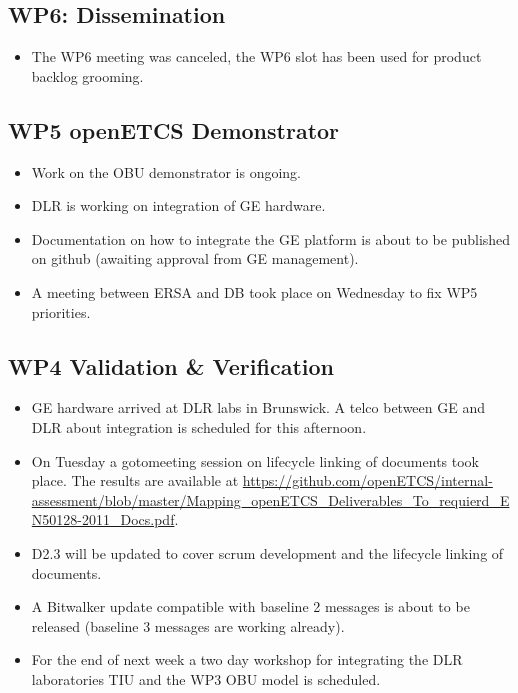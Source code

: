 \documentclass[a4paper, 11pt]{article}
\begin{document}
\subsection{WP6: Dissemination}
\begin{itemize}
\item The WP6 meeting was canceled, the WP6 slot has been used for product backlog grooming.
\end{itemize}

\subsection{WP5 openETCS Demonstrator}

\begin{itemize}
\item Work on the OBU demonstrator is ongoing.
\item DLR is working on integration of GE hardware.
\item Documentation on how to integrate the GE platform is about to be published on github (awaiting approval from GE management).
\item A meeting between ERSA and DB took place on Wednesday to fix WP5 priorities.
\end{itemize}

\subsection{WP4 Validation \& Verification}
\begin{itemize}
\item GE hardware arrived at DLR labs in Brunswick. A telco between GE and DLR about integration is scheduled for this afternoon.
\item On Tuesday a gotomeeting session on lifecycle linking of documents took place. The results are available at \url{https://github.com/openETCS/internal-assessment/blob/master/Mapping_openETCS_Deliverables_To_requierd_EN50128-2011_Docs.pdf}.
\item D2.3 will be updated to cover scrum development and the lifecycle linking of documents. 
\item A Bitwalker update compatible with baseline 2 messages is about to be released (baseline 3 messages are working already).
\item For the end of next week a two day workshop for integrating the DLR laboratories TIU and the WP3 OBU model is scheduled.
\end{itemize}
\end{document}
